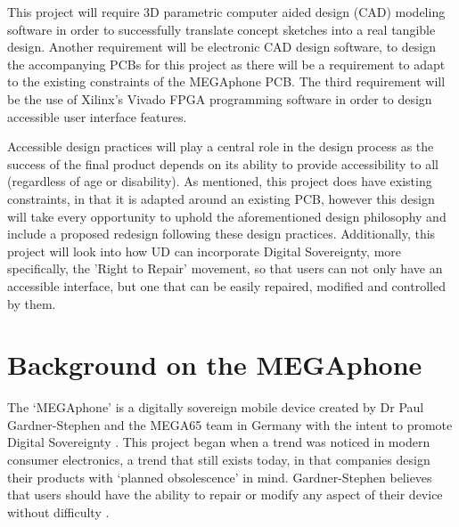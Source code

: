 This project will require 3D parametric computer aided design (CAD) modeling software in order to successfully translate concept sketches into a real tangible design.
Another requirement will be electronic CAD design software, to design the accompanying PCBs for this project as there will be a requirement to adapt to the existing constraints of the MEGAphone PCB.
The third requirement will be the use of Xilinx's Vivado FPGA programming software in order to design accessible user interface features.

Accessible design practices will play a central role in the design process as the success of the final product depends on its ability to provide accessibility to all (regardless of age or disability). 
As mentioned, this project does have existing constraints, in that it is adapted around an existing PCB, however this design will take every opportunity to uphold the aforementioned design philosophy and include a proposed redesign following these design practices.
Additionally, this project will look into how UD can incorporate Digital Sovereignty, more specifically, the 'Right to Repair' movement, so that users can not only have an accessible interface, but one that can be easily repaired, modified and controlled by them.



\section{Background on the MEGAphone} %

The ‘MEGAphone’ is a digitally sovereign mobile device created by Dr Paul Gardner-Stephen and the MEGA65 team in Germany with the intent to promote Digital Sovereignty \cite{mega65}.
This project began when a trend was noticed in modern consumer electronics, a trend that still exists today, in that companies design their products with ‘planned obsolescence’ in mind. 
Gardner-Stephen believes that users should have the ability to repair or modify any aspect of their device without difficulty \cite{mobilehistory}.


